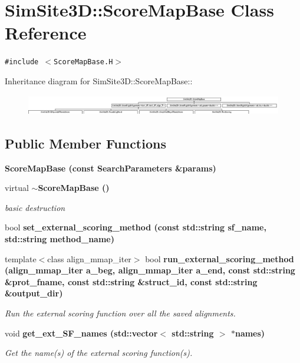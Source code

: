 \section{SimSite3D::Score\-Map\-Base Class Reference}
\label{classSimSite3D_1_1ScoreMapBase}
{\tt \#include $<$Score\-Map\-Base.H$>$}

Inheritance diagram for SimSite3D::Score\-Map\-Base::\begin{figure}[H]
\begin{center}
\leavevmode
\includegraphics[height=0.88189cm]{classSimSite3D_1_1ScoreMapBase}
\end{center}
\end{figure}
\subsection*{Public Member Functions}
\begin{CompactItemize}
\item 
\bf{Score\-Map\-Base} (const \bf{Search\-Parameters} \&params)
\item 
virtual \bf{$\sim$Score\-Map\-Base} ()\label{classSimSite3D_1_1ScoreMapBase_53cc54d782902810408e5e4ebcbbffd5}

\begin{CompactList}\small\item\em basic destruction \item\end{CompactList}\item 
bool \bf{set\_\-external\_\-scoring\_\-method} (const std::string sf\_\-name, std::string method\_\-name)
\item 
template$<$class align\_\-mmap\_\-iter$>$ bool \bf{run\_\-external\_\-scoring\_\-method} (align\_\-mmap\_\-iter a\_\-beg, align\_\-mmap\_\-iter a\_\-end, const std::string \&prot\_\-fname, const std::string \&struct\_\-id, const std::string \&output\_\-dir)
\begin{CompactList}\small\item\em Run the external scoring function over all the saved alignments. \item\end{CompactList}\item 
void \bf{get\_\-ext\_\-SF\_\-names} (std::vector$<$ std::string $>$ $\ast$names)\label{classSimSite3D_1_1ScoreMapBase_b5ee9de7e756e9c6ee3058c475a95958}

\begin{CompactList}\small\item\em Get the name(s) of the external scoring function(s). \item\end{CompactList}\end{CompactItemize}

